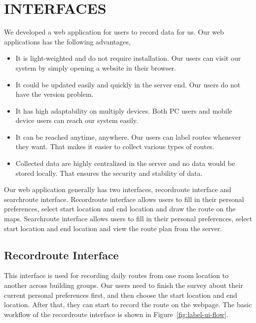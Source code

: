 \documentclass{sigchi}
\begin{document}
\section{INTERFACES}
We developed a web application for users to record data for us. Our web applications has the following advantages,
\begin{itemize}
\item It is light-weighted and do not require installation. Our users can visit our system by simply opening a website in their browser.
\item It could be updated easily and quickly in the server end. Our users do not have the version problem.
\item It has high adaptability on multiply devices. Both PC users and mobile device users can reach our system easily.
\item It can be reached anytime, anywhere. Our users can label routes whenever they want. That makes it easier to collect various types of routes.
\item Collected data are highly centralized in the server and no data would be stored locally. That ensures the security and stability of data.
\end{itemize}
Our web application generally has two interfaces, recordroute interface and searchroute interface. Recordroute interface allows users to fill in their personal preferences, select start location and end location and draw the route on the maps. Searchroute interface allows users to fill in their personal preferences, select start location and end location and view the route plan from the server. 

\subsection{Recordroute Interface}
This interface is used for recording daily routes from one room location to another across building groups. Our users need to finish the survey about their current personal preferences first, and then choose the start location and end location. After that, they can start to record the route on the webpage. The basic workflow of the recordroute interface is shown in Figure~\ref{fig:label-ui-flow}.
\end{document}
